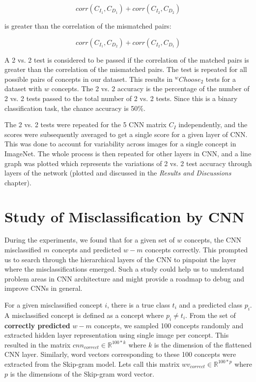 \[corr(C_{I_1},C_{D_1}) + corr(C_{I_2},C_{D_2})  \]

\noindent is greater than the correlation of the mismatched pairs:

\[corr(C_{I_1},C_{D_2}) + corr(C_{I_2},C_{D_1})  \]

A 2 vs. 2 test is considered to be passed if the correlation of the matched pairs is greater than the correlation of the mismatched pairs. The test is repeated for all possible pairs of concepts in our dataset. This results in $^wChoose_2$ tests for a dataset with $w$ concepts. The 2 vs. 2 accuracy is the percentage of the number of 2 vs. 2 tests passed to the total number of 2 vs. 2 tests. Since this is a binary classification task, the chance accuracy is 50\%. %

The 2 vs. 2 tests were repeated for the 5 CNN matrix $C_I$ independently, and the scores were subsequently averaged to get a single score for a given layer of CNN. This was done to account for variability across images for a single concept in ImageNet. The whole process is then repeated for other layers in CNN, and a line graph was plotted which represents the variations of 2 vs. 2 test accuracy through layers of the network (plotted and discussed in the \textit{Results and Discussions} chapter).

\section{Study of Misclassification by CNN}

During the experiments, we found that for a given set of $w$ concepts, the CNN misclassified $m$ concepts and predicted $w-m$ concepts correctly. This prompted us to search through the hierarchical layers of the CNN to pinpoint the layer where the misclassifications emerged. Such a study could help us to understand problem areas in CNN architecture and might provide a roadmap to debug and improve CNNs in general. 

For a given misclassified concept $i$, there is a true class $t_i$ and a predicted class $p_i$. A misclassified concept is defined as a concept where $p_i \neq t_i$. From the set of \textbf{correctly predicted} $w-m$ concepts, we sampled 100 concepts randomly and extracted hidden layer representation using single image per concept. This resulted in the matrix $cnn_{correct} \in \mathbb{R} ^{100*k}$ where $k$ is the dimension of the flattened CNN layer. Similarly, word vectors corresponding to these 100 concepts were extracted from the Skip-gram model. Lets call this matrix $wv_{correct} \in \mathbb{R} ^{100*p}$ where $p$ is the dimensions of the Skip-gram word vector. 


